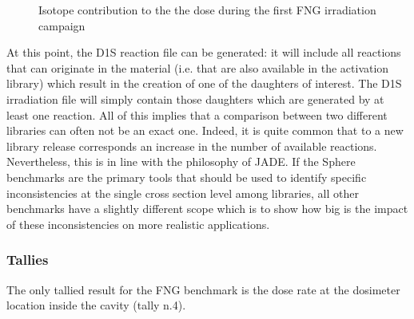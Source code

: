 \documentclass[letterpaper,10pt,english]{sphinxmanual}
\let\sphinxpxdimen\pdfpxdimen\else\newdimen\sphinxpxdimen
\begin{document}
\begin{figure}[htbp]
\centering
\capstart

\noindent\sphinxincludegraphics[width=600\sphinxpxdimen]{{daughtersFNG}.png}
\caption{Isotope contribution to the the dose during the first FNG irradiation campaign}\label{\detokenize{usage/benchmarks:id37}}\end{figure}

\sphinxAtStartPar
At this point, the D1S reaction file can be generated: it will include all reactions that can
originate in the material (i.e. that are also available in the activation library) which result
in the creation of one of the daughters of interest. The D1S irradiation file will simply
contain those daughters which are generated by at least one reaction. All of this implies that
a comparison between two different libraries can often not be an exact one. Indeed, it is quite
common that to a new library release corresponds an increase in the number of available reactions.
Nevertheless, this is in line with the philosophy of JADE. If the Sphere benchmarks are the
primary tools that should be used to identify specific inconsistencies at the single cross section
level among libraries, all other benchmarks have a slightly different scope which is to show how
big is the impact of these inconsistencies on more realistic applications.


\subsubsection{Tallies}
\label{\detokenize{usage/benchmarks:id15}}
\sphinxAtStartPar
The only tallied result for the FNG benchmark is the dose rate at the dosimeter location inside the cavity (tally n.4).


\nopagebreak
\end{document}
